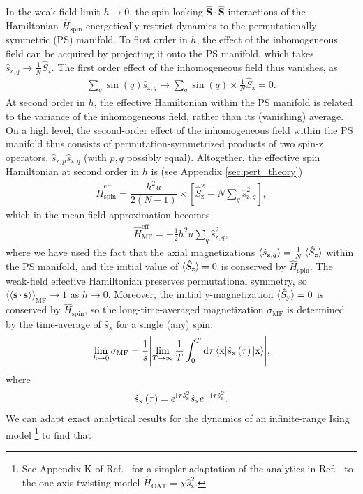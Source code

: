 \documentclass[aps,pra,nofootinbib,twocolumn,superscriptaddress]{revtex4-2}
\renewcommand{\t}{\text} %
\newcommand{\f}[2]{\dfrac{#1}{#2}} %
\newcommand{\p}[1]{\left(#1\right)} %
\renewcommand{\sp}[1]{\left[#1\right]} %
\newcommand{\bk}{\braket} %
\renewcommand{\v}{\bm} %
\renewcommand{\dd}{\text{d}} %
\renewcommand{\i}{\mathrm{i}\mkern1mu} %
\newcommand{\bbk}[1]{\langle\!\langle #1 \rangle\!\rangle}
\newcommand{\1}{\mathds{1}}
\newcommand{\s}{\hat s}
\renewcommand{\H}{\hat H}
\renewcommand{\S}{\hat S}
\newcommand{\x}{\text{x}}
\newcommand{\y}{\text{y}}
\newcommand{\z}{\text{z}}
\newcommand{\spin}{\text{spin}}
\newcommand{\eff}{\text{eff}}
\newcommand{\MF}{\text{MF}}
\newcommand{\sds}{\bar{\v s}\cdot\bar{\v s}}
\begin{document}
In the weak-field limit $h\to0$, the spin-locking $\v\S\cdot\v\S$ interactions of the Hamiltonian $\H_\spin$ energetically restrict dynamics to the permutationally symmetric (PS) manifold.
To first order in $h$, the effect of the inhomogeneous field can be acquired by projecting it onto the PS manifold, which takes $\s_{\z,q}\to\frac1N\S_\z$.
The first order effect of the inhomogeneous field thus vanishes, as
\begin{align}
  \sum_q \sin\p{q} \s_{\z,q}
  \to \sum_q \sin\p{q} \times \frac1N \S_\z
  = 0.
\end{align}
At second order in $h$, the effective Hamiltonian within the PS manifold is related to the variance of the inhomogeneous field, rather than its (vanishing) average.
On a high level, the second-order effect of the inhomogeneous field within the PS manifold thus consists of permutation-symmetrized products of two spin-z operators, $\s_{\z,p}\s_{\z,q}$ (with $p,q$ possibly equal).
Altogether, the effective spin Hamiltonian at second order in $h$ is (see Appendix \ref{sec:pert_theory})
\begin{align}
  \H_\spin^\eff
  = \f{h^2 u}{2(N-1)} \times \sp{\S_\z^2 - N\sum_q \s_{\z,q}^2},
  \label{eq:H_spin_eff}
\end{align}
which in the mean-field approximation becomes
\begin{align}
  \H_\MF^\eff = -\frac12 h^2 u \sum_q \s_{\z,q}^2,
\end{align}
where we have used the fact that the axial magnetizations $\bk{\s_{\z,q}}=\frac1N\bk{\S_\z}$ within the PS manifold, and the initial value of $\bk{\S_\z}=0$ is conserved by $\H_\spin$.
The weak-field effective Hamiltonian preserves permutational symmetry, so $\bbk{\sds}_\MF\to1$ as $h\to0$.
Moreover, the initial y-magnetization $\bk{\S_\y}=0$ is conserved by $\H_\spin$, so the long-time-averaged magnetization $\sigma_\MF$ is determined by the time-average of $\s_\x$ for a single (any) spin:
\begin{align}
  \lim_{h\to0} \sigma_\MF
  = \f1s \abs{\lim_{T\to\infty} \f1T \int_0^T \dd\tau
  \bk{\x|\s_\x\p{\tau}|\x}},
\end{align}
where
\begin{align}
  \s_\x\p{\tau} = e^{\i\tau \s_\z^2} \s_\x e^{-\i\tau \s_\z^2}.
\end{align}
We can adapt exact analytical results for the dynamics of an infinite-range Ising model \cite{foss-feig2013nonequilibrium}\footnote{See Appendix K of Ref.~\cite{perlin2020shorttime} for a simpler adaptation of the analytics in Ref.~\cite{foss-feig2013nonequilibrium} to the one-axis twisting model $\H_{\t{OAT}}=\chi \s_\z^2$.} to find that
\end{document}

